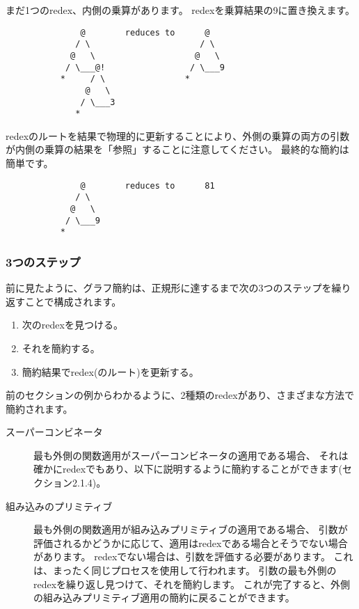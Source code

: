\documentclass{jarticle}
\begin{document}
まだ1つのredex、内側の乗算があります。
redexを乗算結果の9に置き換えます。

\begin{verbatim}
               @        reduces to      @
              / \                      / \
             @   \                    @   \
            / \___@!                 / \___9
           *     / \                *
                @   \
               / \___3
              *
\end{verbatim}

redexのルートを結果で物理的に更新することにより、外側の乗算の両方の引数が内側の乗算の結果を「参照」することに注意してください。
最終的な簡約は簡単です。

\begin{verbatim}
               @        reduces to      81
              / \
             @   \
            / \___9
           *
\end{verbatim}

\subsubsection{3つのステップ}

前に見たように、グラフ簡約は、正規形に達するまで次の3つのステップを繰り返すことで構成されます。

\begin{enumerate}
	\item 次のredexを見つける。
	\item それを簡約する。
	\item 簡約結果でredex(のルート)を更新する。
\end{enumerate}

前のセクションの例からわかるように、2種類のredexがあり、さまざまな方法で簡約されます。

\begin{description}
	\item[スーパーコンビネータ] 最も外側の関数適用がスーパーコンビネータの適用である場合、
		それは確かにredexでもあり、以下に説明するように簡約することができます(セクション2.1.4)。
	\item[組み込みのプリミティブ] 最も外側の関数適用が組み込みプリミティブの適用である場合、
		引数が評価されるかどうかに応じて、適用はredexである場合とそうでない場合があります。
		redexでない場合は、引数を評価する必要があります。
		これは、まったく同じプロセスを使用して行われます。
		引数の最も外側のredexを繰り返し見つけて、それを簡約します。
		これが完了すると、外側の組み込みプリミティブ適用の簡約に戻ることができます。
\end{description}
\end{document}
